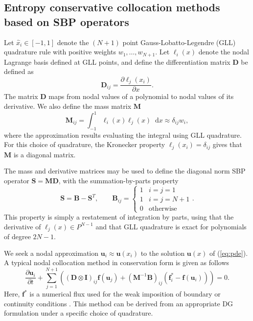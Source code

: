 \documentclass[preprint,10pt]{article}
\theoremstyle{definition}
\theoremstyle{lemma}
\theoremstyle{theorem}
\newcommand{\pd}[2]{\frac{\partial#1}{\partial#2}}
\newcommand{\LRp}[1]{\left( #1 \right)}
\newcommand{\note}[1]{{\color{blue}{#1}}}
\newcommand*\diff[1]{\mathop{}\!{\mathrm{d}#1}}
\begin{document}


\subsection{Entropy conservative collocation methods based on SBP operators}

Let $\widehat{x}_i \in [-1,1]$ denote the $(N+1)$ point Gauss-Lobatto-Legendre (GLL) quadrature rule with positive weights $w_1,\ldots,w_{N+1}$.  Let $\ell_i(x)$ denote the nodal Lagrange basis defined at GLL points, and define the differentiation matrix $\bm{D}$ be defined as 
\[
\bm{D}_{ij} = \pd{\ell_j(x_i)}{x}.
\]
The matrix $\bm{D}$ maps from nodal values of a polynomial to nodal values of its derivative.  We also define the mass matrix $\bm{M}$
\[
\bm{M}_{ij} = \int_{-1}^1 \ell_i(x)\ell_j(x)\diff{x} \approx \delta_{ij} w_i,
\]
where the approximation results evaluating the integral using GLL quadrature.  For this choice of quadrature, the Kronecker property $\ell_j(x_i) = \delta_{ij}$ gives that $\bm{M}$ is a diagonal matrix.  

The mass and derivative matrices may be used to define the diagonal norm SBP operator $\bm{S} = \bm{M}\bm{D}$, with the summation-by-parts property 
\[
\bm{S} = \bm{B} - \bm{S}^T, \qquad \bm{B}_{ij} = \begin{cases}
1 &i = j = 1 \\
1 &i = j = N+1 \\
0 &\text{otherwise}
\end{cases}.
\]
This property is simply a restatement of integration by parts, using that the derivative of $\ell_j(x) \in P^{N-1}$ and that GLL quadrature is exact for polynomials of degree $2N-1$.  

We seek a nodal approximation $\bm{u}_i \approx \bm{u}(x_i)$ to the solution $\bm{u}(x)$ of (\ref{eq:pde}).  A typical nodal collocation method in conservation form is given as follows 
\[
\pd{\bm{u}_i}{t} + \sum_{j=1}^{N+1}\LRp{\LRp{\bm{D}\otimes \bm{I}}_{ij}\bm{f}(\bm{u}_j) +\LRp{\bm{M}^{-1}\bm{B}}_{ij}(\bm{f}_i^* - \bm{f}(\bm{u}_i))} = 0.
\]
Here, $\bm{f}^*$ is a numerical flux used for the weak imposition of boundary or continuity conditions \cite{hesthaven2007nodal}.  This method can be derived from an appropriate DG formulation under a specific choice of quadrature.  
\end{document}
